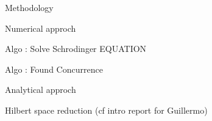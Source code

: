 Methodology



Numerical approch

Algo : Solve Schrodinger EQUATION

Algo : Found Concurrence

Analytical approch 

Hilbert space reduction 
(cf intro report for Guillermo)

